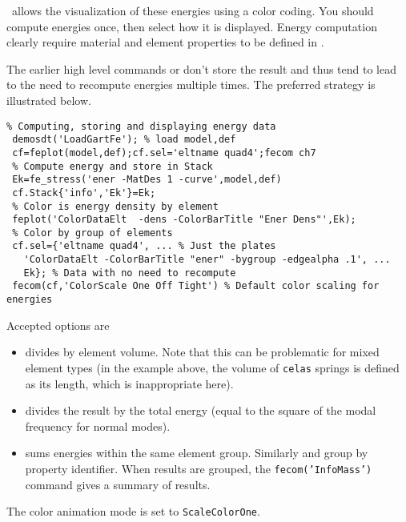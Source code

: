 \begin{SDT}

\feplot\ allows the visualization of these energies using a color coding. You should compute energies once, then select how it is displayed. Energy computation clearly require material and element properties to be defined in .

The earlier high level commands  or  don't store the result and thus tend to lead to the need to recompute energies multiple times. The preferred strategy is illustrated below.

\begin{verbatim}
% Computing, storing and displaying energy data
 demosdt('LoadGartFe'); % load model,def 
 cf=feplot(model,def);cf.sel='eltname quad4';fecom ch7
 % Compute energy and store in Stack
 Ek=fe_stress('ener -MatDes 1 -curve',model,def)
 cf.Stack{'info','Ek'}=Ek;
 % Color is energy density by element
 feplot('ColorDataElt  -dens -ColorBarTitle "Ener Dens"',Ek);
 % Color by group of elements
 cf.sel={'eltname quad4', ... % Just the plates
   'ColorDataElt -ColorBarTitle "ener" -bygroup -edgealpha .1', ...
   Ek}; % Data with no need to recompute
 fecom(cf,'ColorScale One Off Tight') % Default color scaling for energies
\end{verbatim}

Accepted  options are

\begin{itemize}
\item {} divides by element volume. Note that this can be problematic for mixed element types (in the example above, the volume of  {\tt celas} springs is defined as its length, which is inappropriate here).
\item {} divides the result by the total energy (equal to the square of the modal frequency for normal modes).
\item {} sums energies within the same element group. Similarly  and  group by property identifier. When results are grouped, the {\tt fecom('InfoMass')} command gives a summary of results.

\end{itemize}

The color animation mode is set to {\tt ScaleColorOne}.  

\end{SDT}


